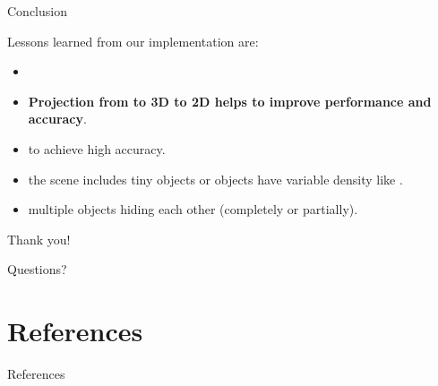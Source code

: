\documentclass[9pt]{beamer}
\begin{document}

\begin{frame}[fragile]{Conclusion }

Lessons learned from our implementation are:

\begin{itemize}
  	\item {} 
	\item \textbf{Projection from to 3D to 2D helps to improve performance and accuracy}.
	\item {} to achieve high accuracy.
\end{itemize}


\begin{itemize}
	\item the scene includes tiny objects or objects have variable density like .
	\item  multiple objects hiding each other (completely or partially).
\end{itemize}

\end{frame}


\appendix
\begin{frame}[fragile]{}

\centering
\Huge
Thank you!

Questions?

\end{frame}

\section{References}
\begin{frame}[allowframebreaks]{References}

	
	

\end{frame}
\end{document}
